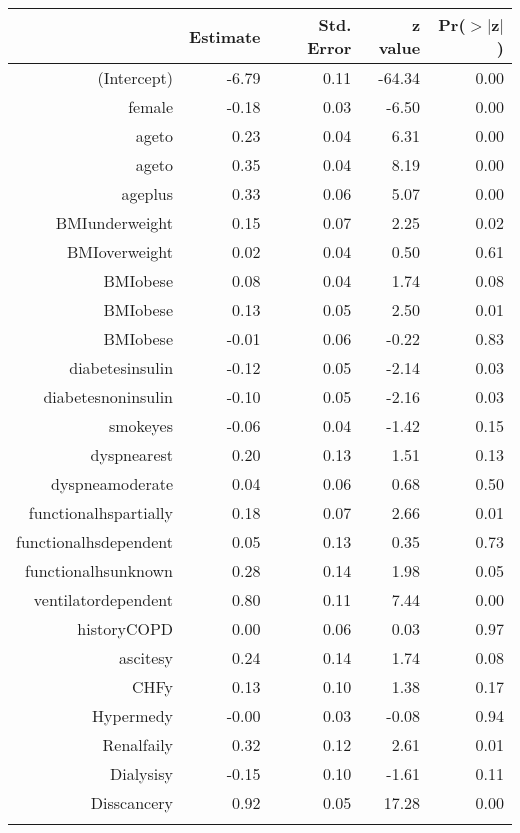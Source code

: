 \bigskip\bigskip
\centering
\begin{tabular}{rrrrr}
  \hline
 & Estimate & Std. Error & z value & Pr($>$$|$z$|$) \\ 
  \hline
(Intercept) & -6.79 & 0.11 & -64.34 & 0.00 \\ 
  female & -0.18 & 0.03 & -6.50 & 0.00 \\ 
  age\-65\-to\-74 & 0.23 & 0.04 & 6.31 & 0.00 \\ 
  age\-75\-to\-84 & 0.35 & 0.04 & 8.19 & 0.00 \\ 
  age\-85\-plus & 0.33 & 0.06 & 5.07 & 0.00 \\ 
  BMI\-underweight & 0.15 & 0.07 & 2.25 & 0.02 \\ 
  BMI\-overweight & 0.02 & 0.04 & 0.50 & 0.61 \\ 
  BMI\-obese\-1 & 0.08 & 0.04 & 1.74 & 0.08 \\ 
  BMI\-obese\-2 & 0.13 & 0.05 & 2.50 & 0.01 \\ 
  BMI\-obese\-3 & -0.01 & 0.06 & -0.22 & 0.83 \\ 
  diabetes\-insulin & -0.12 & 0.05 & -2.14 & 0.03 \\ 
  diabetes\-noninsulin & -0.10 & 0.05 & -2.16 & 0.03 \\ 
  smoke\-yes & -0.06 & 0.04 & -1.42 & 0.15 \\ 
  dyspnea\-rest & 0.20 & 0.13 & 1.51 & 0.13 \\ 
  dyspnea\-moderate & 0.04 & 0.06 & 0.68 & 0.50 \\ 
  functional\-hs\-partially & 0.18 & 0.07 & 2.66 & 0.01 \\ 
  functional\-hs\-dependent & 0.05 & 0.13 & 0.35 & 0.73 \\ 
  functional\-hs\-unknown & 0.28 & 0.14 & 1.98 & 0.05 \\ 
  ventilator\-dependent & 0.80 & 0.11 & 7.44 & 0.00 \\ 
  history\-COPD & 0.00 & 0.06 & 0.03 & 0.97 \\ 
  ascites\-y & 0.24 & 0.14 & 1.74 & 0.08 \\ 
  CHF\-y & 0.13 & 0.10 & 1.38 & 0.17 \\ 
  Hyper\-med\-y & -0.00 & 0.03 & -0.08 & 0.94 \\ 
  Renal\-fail\-y & 0.32 & 0.12 & 2.61 & 0.01 \\ 
  Dialysis\-y & -0.15 & 0.10 & -1.61 & 0.11 \\ 
  Diss\-cancer\-y & 0.92 & 0.05 & 17.28 & 0.00 \\ 
$$
\end{tabular}
